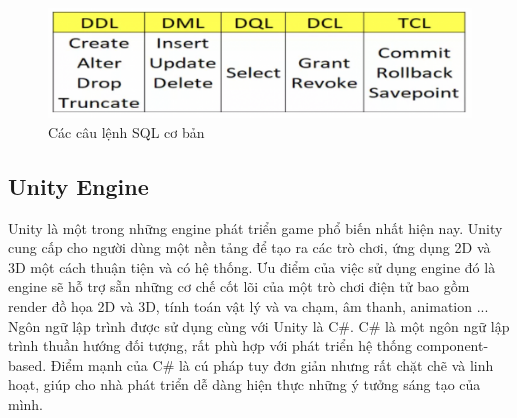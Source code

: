\begin{figure}[H]
	\centering
	\includegraphics[width=\textwidth]{Images/lệnh SQL.png}
	\vspace{0.5cm}
	\caption{Các câu lệnh SQL cơ bản}
\end{figure}
\subsection{Unity Engine}
Unity là một trong những engine phát triển game phổ biến nhất hiện nay. Unity cung cấp cho người dùng một nền tảng để tạo ra các trò chơi, ứng dụng 2D và 3D một cách thuận tiện và có hệ thống. Ưu điểm của việc sử dụng engine đó là engine sẽ hỗ trợ sẵn những cơ chế cốt lõi của một trò chơi điện tử bao gồm render đồ họa 2D và 3D, tính toán vật lý và va chạm, âm thanh, animation ...\\
Ngôn ngữ lập trình được sử dụng cùng với Unity là C\#. C\# là một ngôn ngữ lập trình thuần hướng đối tượng, rất phù hợp với phát triển hệ thống component-based. Điểm mạnh của C\# là cú pháp tuy đơn giản nhưng rất chặt chẽ và linh hoạt, giúp cho nhà phát triển dễ dàng hiện thực những ý tưởng sáng tạo của mình.\\
